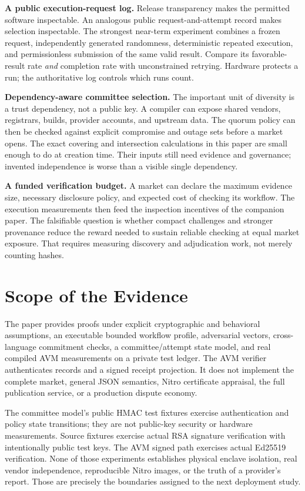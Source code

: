\textbf{A public execution-request log.} Release transparency makes the permitted software inspectable. An analogous public request-and-attempt record makes selection inspectable. The strongest near-term experiment combines a frozen request, independently generated randomness, deterministic repeated execution, and permissionless submission of the same valid result. Compare its favorable-result rate \emph{and} completion rate with unconstrained retrying. Hardware protects a run; the authoritative log controls which runs count.

\textbf{Dependency-aware committee selection.} The important unit of diversity is a trust dependency, not a public key. A compiler can expose shared vendors, registrars, builds, provider accounts, and upstream data. The quorum policy can then be checked against explicit compromise and outage sets before a market opens. The exact covering and intersection calculations in this paper are small enough to do at creation time. Their inputs still need evidence and governance; invented independence is worse than a visible single dependency.

\textbf{A funded verification budget.} A market can declare the maximum evidence size, necessary disclosure policy, and expected cost of checking its workflow. The execution measurements then feed the inspection incentives of the companion paper. The falsifiable question is whether compact challenges and stronger provenance reduce the reward needed to sustain reliable checking at equal market exposure. That requires measuring discovery and adjudication work, not merely counting hashes.

\section{Scope of the Evidence}

The paper provides proofs under explicit cryptographic and behavioral assumptions, an executable bounded workflow profile, adversarial vectors, cross-language commitment checks, a committee/attempt state model, and real compiled AVM measurements on a private test ledger. The AVM verifier authenticates records and a signed receipt projection. It does not implement the complete market, general JSON semantics, Nitro certificate appraisal, the full publication service, or a production dispute economy.

The committee model's public HMAC test fixtures exercise authentication and policy state transitions; they are not public-key security or hardware measurements. Source fixtures exercise actual RSA signature verification with intentionally public test keys. The AVM signed path exercises actual Ed25519 verification. None of those experiments establishes physical enclave isolation, real vendor independence, reproducible Nitro images, or the truth of a provider's report. Those are precisely the boundaries assigned to the next deployment study.

